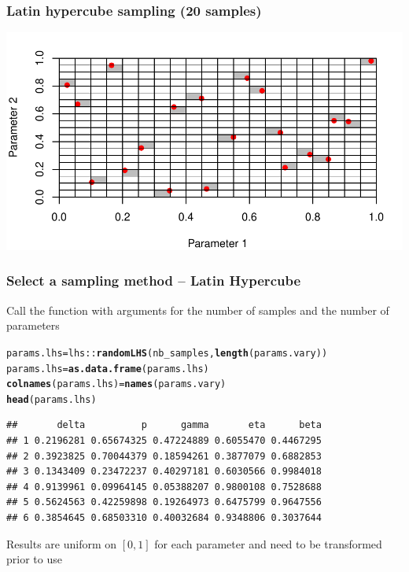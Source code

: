 \documentclass[aspectratio=169]{beamer}\usepackage[]{graphicx}\usepackage[]{xcolor}
\makeatletter
\def\maxwidth{ %
  \ifdim\Gin@nat@width>\linewidth
    \linewidth
  \else
    \Gin@nat@width
  \fi
}
\newcommand{\hlopt}[1]{\textcolor[rgb]{0,0,0}{#1}}%
\newcommand{\hldef}[1]{\textcolor[rgb]{0.345,0.345,0.345}{#1}}%
\newcommand{\hlkwb}[1]{\textcolor[rgb]{0.69,0.353,0.396}{#1}}%
\newcommand{\hlkwd}[1]{\textcolor[rgb]{0.737,0.353,0.396}{\textbf{#1}}}%
\newenvironment{kframe}{%
 \def\at@end@of@kframe{}%
 \ifinner\ifhmode%
  \def\at@end@of@kframe{\end{minipage}}%
  \begin{minipage}{\columnwidth}%
 \fi\fi%
 \def\FrameCommand##1{\hskip\@totalleftmargin \hskip-\fboxsep
 \colorbox{shadecolor}{##1}\hskip-\fboxsep
     \hskip-\linewidth \hskip-\@totalleftmargin \hskip\columnwidth}%
 \MakeFramed {\advance\hsize-\width
   \@totalleftmargin\z@ \linewidth\hsize
   \@setminipage}}%
 {\par\unskip\endMakeFramed%
 \at@end@of@kframe}
\newenvironment{knitrout}{}{} %
\makeatother
\begin{document}
\begin{frame}[fragile]\frametitle{Latin hypercube sampling (20 samples)}
\begin{knitrout}
\color{fgcolor}
\includegraphics[width=\maxwidth]{FIGS/comp-analysis-lhs-sampling-2d-example-1} 
\end{knitrout}
\end{frame}

\begin{frame}[fragile]\frametitle{Select a sampling method -- Latin Hypercube}
Call the function with arguments for the number of samples and the number of parameters
\begin{knitrout}
\color{fgcolor}\begin{kframe}
\begin{alltt}
\hldef{params.lhs} \hlkwb{=} \hldef{lhs}\hlopt{::}\hlkwd{randomLHS}\hldef{(nb_samples,} \hlkwd{length}\hldef{(params.vary))}
\hldef{params.lhs} \hlkwb{=} \hlkwd{as.data.frame}\hldef{(params.lhs)}
\hlkwd{colnames}\hldef{(params.lhs)} \hlkwb{=} \hlkwd{names}\hldef{(params.vary)}
\hlkwd{head}\hldef{(params.lhs)}
\end{alltt}
\begin{verbatim}
##       delta          p      gamma       eta      beta
## 1 0.2196281 0.65674325 0.47224889 0.6055470 0.4467295
## 2 0.3923825 0.70044379 0.18594261 0.3877079 0.6882853
## 3 0.1343409 0.23472237 0.40297181 0.6030566 0.9984018
## 4 0.9139961 0.09964145 0.05388207 0.9800108 0.7528688
## 5 0.5624563 0.42259898 0.19264973 0.6475799 0.9647556
## 6 0.3854645 0.68503310 0.40032684 0.9348806 0.3037644
\end{verbatim}
\end{kframe}
\end{knitrout}
\vfill
Results are uniform on $[0,1]$ for each parameter and need to be transformed prior to use
\end{frame}
\end{document}
